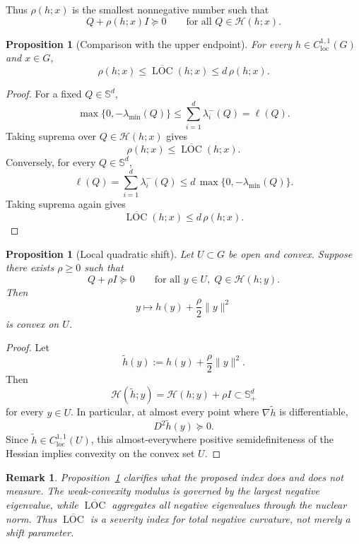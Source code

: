 \documentclass[11pt]{article}
\numberwithin{equation}{section}
\newtheorem{proposition}[theorem]{Proposition}
\newtheorem{remark}[theorem]{Remark}
\newcommand{\Sd}{\mathbb S^d}
\newcommand{\Spd}{\mathbb S^d_+}
\newcommand{\Hess}{\mathcal H}
\newcommand{\LOC}{\operatorname{LOC}}
\begin{document}
	Thus \(\rho(h;x)\) is the smallest nonnegative number such that
	\[
	Q+\rho(h;x)I\succeq0
	\qquad
	\text{for all }Q\in\Hess(h;x).
	\]
	
	\begin{proposition}[Comparison with the upper endpoint]
		\label{prop:weak-comparison}
		For every \(h\in C^{1,1}_{\mathrm{loc}}(G)\) and \(x\in G\),
		\[
		\rho(h;x)
		\leq
		\overline{\LOC}(h;x)
		\leq
		d\,\rho(h;x).
		\]
	\end{proposition}
	
	\begin{proof}
		For a fixed \(Q\in\Sd\),
		\[
		\max\{0,-\lambda_{\min}(Q)\}
		\leq
		\sum_{i=1}^d \lambda_i^-(Q)
		=
		\ell(Q).
		\]
		Taking suprema over \(Q\in\Hess(h;x)\) gives
		\[
		\rho(h;x)\leq\overline{\LOC}(h;x).
		\]
		Conversely, for every \(Q\in\Sd\),
		\[
		\ell(Q)
		=
		\sum_{i=1}^d \lambda_i^-(Q)
		\leq
		d\,\max\{0,-\lambda_{\min}(Q)\}.
		\]
		Taking suprema again gives
		\[
		\overline{\LOC}(h;x)\leq d\,\rho(h;x).
		\]
	\end{proof}
	
	\begin{proposition}[Local quadratic shift]
		\label{prop:quadratic-shift}
		Let \(U\subset G\) be open and convex. Suppose there exists \(\rho\geq0\) such that
		\[
		Q+\rho I\succeq0
		\qquad
		\text{for all }y\in U,\; Q\in\Hess(h;y).
		\]
		Then
		\[
		y\mapsto h(y)+\frac{\rho}{2}\|y\|^2
		\]
		is convex on \(U\).
	\end{proposition}
	
	\begin{proof}
		Let
		\[
		\widetilde h(y)
		:=
		h(y)+\frac{\rho}{2}\|y\|^2.
		\]
		Then
		\[
		\Hess(\widetilde h;y)
		=
		\Hess(h;y)+\rho I
		\subset
		\Spd
		\]
		for every \(y\in U\). In particular, at almost every point where \(\nabla \widetilde h\) is differentiable,
		\[
		D^2\widetilde h(y)\succeq0.
		\]
		Since \(\widetilde h\in C^{1,1}_{\mathrm{loc}}(U)\), this almost-everywhere positive semidefiniteness of the Hessian implies convexity on the convex set \(U\).
	\end{proof}
	
	\begin{remark}
		Proposition~\ref{prop:weak-comparison} clarifies what the proposed index does and does not measure. The weak-convexity modulus is governed by the largest negative eigenvalue, while \(\overline{\LOC}\) aggregates all negative eigenvalues through the nuclear norm. Thus \(\overline{\LOC}\) is a severity index for total negative curvature, not merely a shift parameter.
	\end{remark}
	
\end{document}
